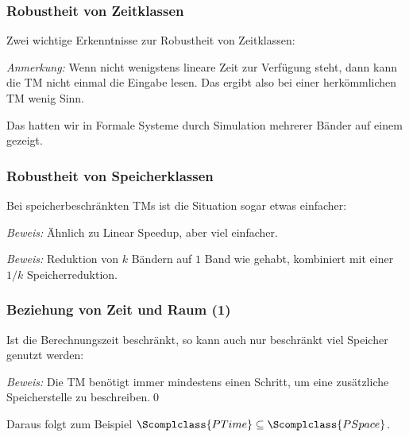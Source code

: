 \documentclass[aspectratio=1610,onlymath]{beamer}
\begin{document}
\begin{frame}\frametitle{Robustheit von Zeitklassen}

Zwei wichtige Erkenntnisse zur Robustheit von Zeitklassen:
\bigskip

\bigskip

\emph{Anmerkung:} Wenn nicht wenigstens lineare Zeit zur Verfügung steht, dann kann die TM nicht einmal die Eingabe lesen. Das ergibt also bei einer herkömmlichen TM wenig Sinn.
\bigskip\pause

\bigskip

Das hatten wir in Formale Systeme durch Simulation mehrerer Bänder auf einem gezeigt.

\end{frame}

\begin{frame}\frametitle{Robustheit von Speicherklassen}

Bei speicherbeschränkten TMs ist die Situation sogar etwas einfacher:
\bigskip

\bigskip\pause

\emph{Beweis:} Ähnlich zu Linear Speedup, aber viel einfacher.\bigskip\pause

\bigskip\pause

\emph{Beweis:} Reduktion von $k$ Bändern auf $1$ Band wie gehabt, kombiniert mit einer $1/k$ Speicherreduktion.

\end{frame}


\begin{frame}\frametitle{Beziehung von Zeit und Raum (1)}

Ist die Berechnungszeit beschränkt, so kann auch nur beschränkt viel 
Speicher genutzt werden:\bigskip


\emph{Beweis:} Die TM benötigt immer mindestens einen Schritt, um eine zusätzliche Speicherstelle zu beschreiben.\qed\bigskip

\pause Daraus folgt zum Beispiel $\Scomplclass{PTime}\subseteq\Scomplclass{PSpace}$.

\end{frame}
\end{document}
